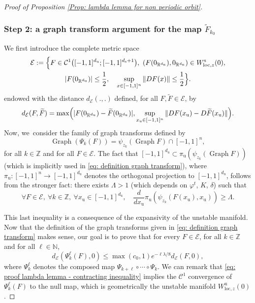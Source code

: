 \documentclass[11pt]{article}
\newcommand{\loc}{\mathrm{loc}}
\newcommand{\rs}{\mathrm{s}}
\newcommand{\ru}{\mathrm{u}}
\theoremstyle{definition}
\theoremstyle{plain}
\newcommand{\Ccal}{\mathcal{C}}
\newcommand{\Ecal}{\mathcal{E}}
\newcommand{\N}{\mathbb{N}}
\newcommand{\R}{\mathbb{R}}
\newcommand{\Z}{\mathbb{Z}}
\DeclareMathOperator{\Graph}{Graph}
\begin{document}
\begin{appendix}
\begin{proof}[Proof of Proposition \ref{Prop: lambda lemma for non periodic orbit}]
\subsubsection*{Step 2: a graph transform argument for the map $\widetilde{F}_{k_0}$}
We first introduce the complete metric space
\begin{multline*}
\Ecal:= \Bigl\{ F \in \Ccal^{1} \bigl([-1,1]^{d_\ru}; [-1,1]^{d_\rs + 1} \bigr),\
\left(F(0_{\R^{d_\ru}}), 0_{\R^{d_\ru}} \right) \in W_{\loc,z}^\rs(0),\\
|F(0_{\R^{d_\ru}})| \leq \frac{1}{2}, \quad
\sup_{x \in [-1,1]^n} \|DF(x)\| \leq \frac{1}{2} \Bigr\}.
\end{multline*}
endowed with the distance $d_{\Ecal} (.,.)$ defined, for all $F, \widetilde{F} \in \Ecal$, by
\[
d_{\Ecal}(F, \widetilde{F}) = \max \Bigl(|F (0_{\R^{d_\ru}}) - \widetilde{F} (0_{\R^{d_\ru}})|, \sup_{x_\ru \in [-1,1]^n} \|DF (x_\ru) - D\widetilde{F} (x_\ru) \| \Bigr).
\]
Now, we~consider the family of graph transforms defined by
\begin{equation}\label{eq: definition graph transform}
\Graph \left(\Psi_k (F) \right) = \psi_{z_k} (\Graph F) \cap [-1, 1]^n,
\end{equation}
for all $ k \in \Z$ and for all $F \in \Ecal$. The fact that $[-1, 1]^{d_\ru} \subset \pi_\ru \left(\psi_{z_k} \left(\Graph F \right)\right)$ (which is implicitly used in \eqref{eq: definition graph transform}), where $\pi_\ru: [-1,1]^n \to [-1,1]^{d_\ru}$ denotes the orthogonal projection to $[-1,1]^{d_\ru}$, follows from the stronger fact: there exists $\Lambda > 1$ (which depends on $\varphi^t$, $K$, $\delta$) such that
\begin{equation}\label{eq: expansivity in the unstable direction}
\forall F \in \Ecal, \: \forall k \in \Z, \: \forall x_\ru \in [- 1, 1]^{d_\ru}, \quad \frac{d}{d x_\ru} \pi_\ru \left(\psi_{z_k} \left(F(x_\ru), x_\ru \right) \right) \geq \Lambda.
\end{equation}

This last inequality is a consequence of the expansivity of the unstable manifold. Now that the definition of the graph transforms given in \eqref{eq: definition graph transform} makes sense, our goal is to prove that for every $F \in \Ecal$, for all $k \in \Z$ and for all $\ell \in \N$,
\begin{equation}\label{eq: proof lambda lemma - contracting inequality}
d_{\Ecal} \left(\Psi_k^{\ell}(F), 0 \right) \leq \max (c_0, 1) e^{-\ell \lambda / 8} d_{\Ecal} \left(F, 0 \right),
\end{equation}
where $\Psi_k^{\ell}$ denotes the composed map $\Psi_{k + \ell} \circ \cdots \circ \Psi_{k}$.
We can remark that \eqref{eq: proof lambda lemma - contracting inequality} implies the $\Ccal^1$ convergence of $\Psi_k^{\ell}(F)$ to the null map, which is geometrically the unstable manifold $W_{\loc, z}^\ru (0)$.


\end{proof}
\end{appendix}
\end{document}
